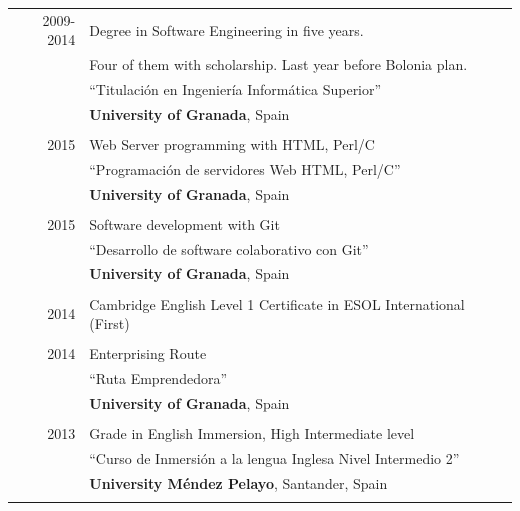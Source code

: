 \documentclass[a4paper,10pt]{article} %
\begin{document}
\begin{tabular}{rl}	

\textsc{2009-2014}& Degree in Software Engineering in five years.\\
& Four of them with scholarship. Last year before Bolonia plan. \\& ``Titulación
en Ingeniería Informática Superior'' \\& \normalsize\textbf{University of Granada}, Spain\\
&\\


\textsc{2015} & Web Server programming with HTML, Perl/C 
\\& ``Programación de servidores Web HTML, Perl/C''
\\& \normalsize\textbf{University of Granada}, Spain\\
&\\


\textsc{2015} & Software development with Git
\\& ``Desarrollo de software colaborativo con Git''
\\& \normalsize\textbf{University of Granada}, Spain\\
&\\


\textsc{2014} & Cambridge English Level 1 Certificate in ESOL International
(First)\\
&\\


\textsc{2014} & Enterprising Route
\\& ``Ruta Emprendedora''
\\& \normalsize\textbf{University of Granada}, Spain\\
&\\


\textsc{2013} & Grade in English Immersion, High Intermediate level 
\\& ``Curso de Inmersión a la lengua Inglesa Nivel Intermedio 2''
\\& \normalsize\textbf{University Méndez Pelayo}, Santander, Spain\\
&\\


\end{tabular}
\end{document}
